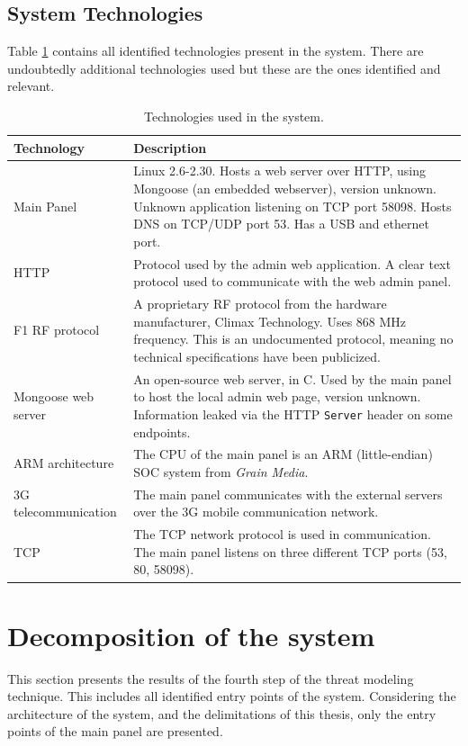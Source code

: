 \subsection{System Technologies}
Table \ref{tb:system-technologies} contains all identified technologies present in the system. There are undoubtedly additional technologies used but these are the ones identified and relevant.
\begin{table}[!p]
    \centering
    \begin{tabularx}{\textwidth}{l X}
        \hline
        \textbf{Technology}  & \textbf{Description}
        \\ \hline
        Main Panel & Linux 2.6-2.30. Hosts a web server over HTTP, using Mongoose (an embedded webserver), version unknown. Unknown application listening on TCP port 58098. Hosts DNS on TCP/UDP port 53. Has a USB and ethernet port.
        \\ \hline
        HTTP  & Protocol used by the admin web application. A clear text protocol used to communicate with the web admin panel.
        \\ \hline
        F1 RF protocol  & A proprietary \gls{RF} protocol from the hardware manufacturer, Climax Technology. Uses 868 MHz frequency. This is an undocumented protocol, meaning no technical specifications have been publicized.
        \\ \hline
        Mongoose web server  & An open-source web server, in C. Used by the main panel to host the local admin web page, version unknown. Information leaked via the HTTP \texttt{Server} header on some endpoints.
        \\ \hline
        ARM architecture  & The CPU of the main panel is an ARM (little-endian) SOC system from \textit{Grain Media}.
        \\ \hline
        3G telecommunication  & The main panel communicates with the external servers over the 3G mobile communication network.
        \\ \hline
        TCP  & The \gls{TCP} network protocol is used in communication. The main panel listens on three different TCP ports (53, 80, 58098).
        \\ \hline
    \end{tabularx}
    \caption{Technologies used in the system.}
    \label{tb:system-technologies}
\end{table}

\section{Decomposition of the system}
This section presents the results of the fourth step of the threat modeling technique. This includes all identified entry points of the system. Considering the architecture of the system, and the delimitations of this thesis, only the entry points of the main panel are presented.

